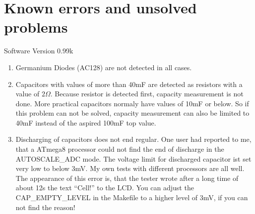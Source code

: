 
\chapter{Known errors and unsolved problems}
{\center Software Version 0.99k}

\begin{enumerate}
\item Germanium Diodes (AC128) are not detected in all cases.
\item Capacitors with values of more than 40mF are detected as resistors with a value of \(2\Omega\).
Because resistor is detected first, capacity measurement is not done. More practical capacitors normaly have
values of 10mF or below. So if this problem can not be solved, capacity measurement can also be limited to
40mF instead of the aspired 100mF top value.
\item Discharging of capacitors does not end regular. One user had reported to me, that a ATmega8 processor could not
find the end of discharge in the AUTOSCALE\_ADC mode.
The voltage limit for discharged capacitor ist set very low to below 3mV. My own tests with different processors are all well.
The appearance of this error is, that the tester wrote after a long time of about 12s the text ``Cell!'' to the LCD.
You can adjust the CAP\_EMPTY\_LEVEL in the Makefile to a higher level of 3mV, if you can not find the reason!

\end{enumerate}
